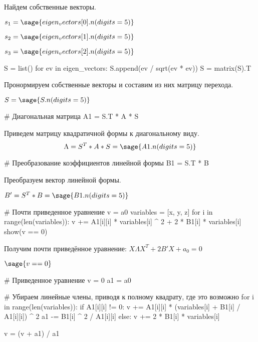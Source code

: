 \documentclass[14pt, a4paper]{extarticle}
\begin{document}
Найдем собственные векторы.

$s_1 = \sage{eigen_vectors[0].n(digits=5)}$

$s_2 = \sage{eigen_vectors[1].n(digits=5)}$

$s_3 = \sage{eigen_vectors[2].n(digits=5)}$

\begin{sagesilent}
    S = list()
    for ev in eigen_vectors:
        S.append(ev / sqrt(ev * ev))
    S = matrix(S).T
\end{sagesilent}

Пронормируем собственные векторы и составим из них матрицу перехода.

$S = \sage{S.n(digits=5)}$

\begin{sagesilent}
    # Диагональная матрица
    A1 = S.T * A * S
\end{sagesilent}

Приведем матрицу квадратичной формы к диагональному виду.
$$\Lambda = S^T * A * S = \sage{A1.n(digits=5)}$$

\begin{sagesilent}
    # Преобразование коэффициентов линейной формы
    B1 = S.T * B
\end{sagesilent}

Преобразуем вектор линейной формы.

$B' = S^T * B = \sage{B1.n(digits=5)}$

\begin{sagesilent}
    # Почти приведенное уравнение
    v = a0
    variables = [x, y, z]
    for i in range(len(variables)):
        v += A1[i][i] * variables[i] ^ 2 + 2 * B1[i] * variables[i]
    show(v == 0)
\end{sagesilent}

Получим почти приведённое уравнение: $X \Lambda X^T + 2 B' X + a_0 = 0$

$\sage{v == 0}$

\begin{sagesilent}
    # Приведенное уравнение
    v = 0
    a1 = a0

    # Убираем линейные члены, приводя к полному квадрату, где это возможно
    for i in range(len(variables)):
        if A1[i][i] != 0:
            v += A1[i][i] * (variables[i] + B1[i] / A1[i][i]) ^ 2
            a1 -= B1[i] ^ 2 / A1[i][i]
        else:
            v += 2 * B1[i] * variables[i]

    v = (v + a1) / a1
\end{sagesilent}
\end{document}
